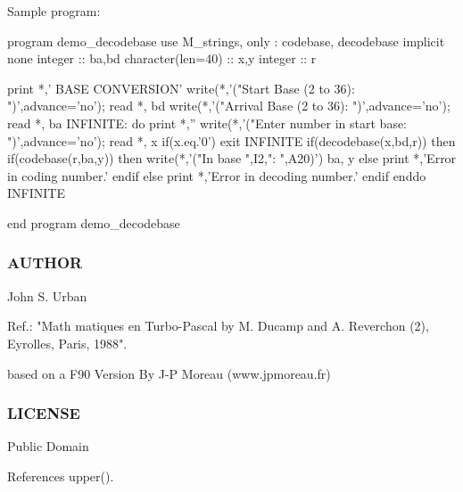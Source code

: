 \begin{DoxyVerb}Sample program:

 program demo_decodebase
 use M_strings, only : codebase, decodebase
 implicit none
 integer           :: ba,bd
 character(len=40) :: x,y
 integer           :: r

 print *,' BASE CONVERSION'
 write(*,'("Start   Base (2 to 36): ")',advance='no'); read *, bd
 write(*,'("Arrival Base (2 to 36): ")',advance='no'); read *, ba
 INFINITE: do
    print *,''
    write(*,'("Enter number in start base: ")',advance='no'); read *, x
    if(x.eq.'0') exit INFINITE
    if(decodebase(x,bd,r)) then
       if(codebase(r,ba,y)) then
         write(*,'("In base ",I2,": ",A20)')  ba, y
       else
         print *,'Error in coding number.'
       endif
    else
       print *,'Error in decoding number.'
    endif
 enddo INFINITE

 end program demo_decodebase
\end{DoxyVerb}


\subsubsection*{A\+U\+T\+H\+OR}

John S. Urban

Ref.\+: "Math matiques en Turbo-\/\+Pascal by M. Ducamp and A. Reverchon (2), Eyrolles, Paris, 1988".

based on a F90 Version By J-\/P Moreau (www.\+jpmoreau.\+fr)

\subsubsection*{L\+I\+C\+E\+N\+SE}

Public Domain 

References upper().

